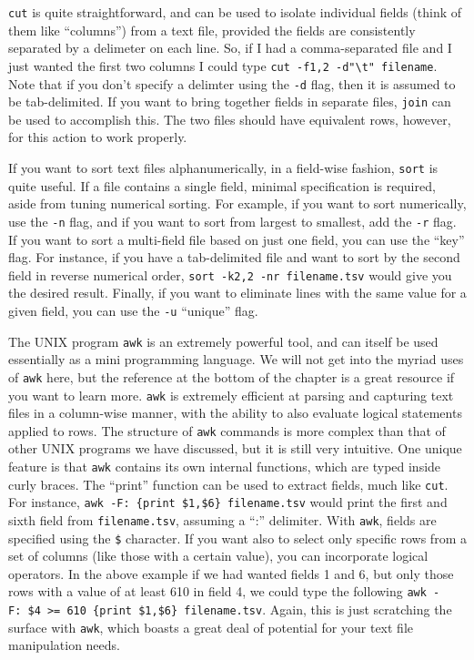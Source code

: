 \documentclass[]{book}
\begin{document}
\texttt{cut} is quite straightforward, and can be used to isolate individual fields (think of them like ``columns'') from a text file, provided the fields are consistently separated by a delimeter on each line. So, if I had a comma-separated file and I just wanted the first two columns I could type \texttt{cut\ -f1,2\ -d"\textbackslash{}t"\ filename}. Note that if you don't specify a delimter using the \texttt{-d} flag, then it is assumed to be tab-delimited. If you want to bring together fields in separate files, \texttt{join} can be used to accomplish this. The two files should have equivalent rows, however, for this action to work properly.

If you want to sort text files alphanumerically, in a field-wise fashion, \texttt{sort} is quite useful. If a file contains a single field, minimal specification is required, aside from tuning numerical sorting. For example, if you want to sort numerically, use the \texttt{-n} flag, and if you want to sort from largest to smallest, add the \texttt{-r} flag. If you want to sort a multi-field file based on just one field, you can use the ``key'' flag. For instance, if you have a tab-delimited file and want to sort by the second field in reverse numerical order, \texttt{sort\ -k2,2\ -nr\ filename.tsv} would give you the desired result. Finally, if you want to eliminate lines with the same value for a given field, you can use the \texttt{-u} ``unique'' flag.

The UNIX program \texttt{awk} is an extremely powerful tool, and can itself be used essentially as a mini programming language. We will not get into the myriad uses of \texttt{awk} here, but the reference at the bottom of the chapter is a great resource if you want to learn more. \texttt{awk} is extremely efficient at parsing and capturing text files in a column-wise manner, with the ability to also evaluate logical statements applied to rows. The structure of \texttt{awk} commands is more complex than that of other UNIX programs we have discussed, but it is still very intuitive. One unique feature is that \texttt{awk} contains its own internal functions, which are typed inside curly braces. The ``print'' function can be used to extract fields, much like \texttt{cut}. For instance, \texttt{awk\ -F:\ \textquotesingle{}\{print\ \$1,\$6\}\textquotesingle{}\ filename.tsv} would print the first and sixth field from \texttt{filename.tsv}, assuming a ``:'' delimiter. With \texttt{awk}, fields are specified using the \texttt{\$} character. If you want also to select only specific rows from a set of columns (like those with a certain value), you can incorporate logical operators. In the above example if we had wanted fields 1 and 6, but only those rows with a value of at least 610 in field 4, we could type the following \texttt{awk\ -F:\ \textquotesingle{}\$4\ \textgreater{}=\ 610\ \{print\ \$1,\$6\}\textquotesingle{}\ filename.tsv}. Again, this is just scratching the surface with \texttt{awk}, which boasts a great deal of potential for your text file manipulation needs.
\end{document}
